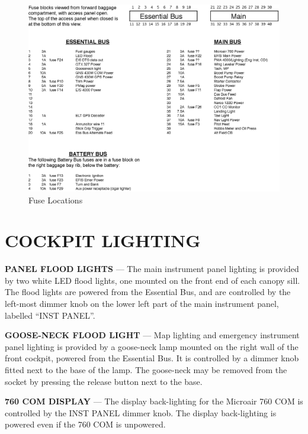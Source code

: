 \begin{figure}
\centering
\includegraphics[scale=0.8]{../Diagrams/Fuse_Blocks_POH} \caption{Fuse Locations}


\end{figure}

\FloatBarrier

\section{COCKPIT LIGHTING}

\textbf{PANEL FLOOD LIGHTS} --- The main instrument panel lighting is provided by two white LED flood lights, one mounted on the front end of each canopy sill. The flood lights are powered from the Essential Bus, and are controlled by the left-most dimmer knob on the lower left part of the main instrument panel, labelled ``INST PANEL''.

\textbf{GOOSE-NECK FLOOD LIGHT} --- Map lighting and emergency instrument panel lighting is provided by a goose-neck lamp mounted on the right wall of the front cockpit, powered from the Essential Bus. It is controlled by a dimmer knob fitted next to the base of the lamp. The goose-neck may be removed from the socket by pressing the release button next to the base.

\textbf{760 COM DISPLAY} --- The display back-lighting for the Microair 760 COM is controlled by the INST PANEL dimmer knob. The display back-lighting is powered even if the 760 COM is unpowered.

